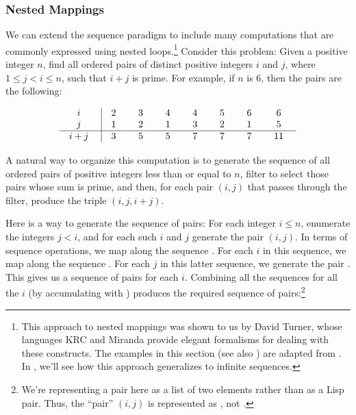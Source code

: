 \subsubsection*{Nested Mappings}

We can extend the sequence paradigm to include many computations that are
commonly expressed using nested loops.\footnote{This approach to nested
mappings was shown to us by David Turner, whose languages KRC and Miranda
provide elegant formalisms for dealing with these constructs.  The examples in
this section (see also ) are adapted from .  In
, we'll see how this approach generalizes to infinite
sequences.} Consider this problem: Given a positive integer \( n \), find all
ordered pairs of distinct positive integers \( i \) and \( j \), where
\( 1 \le j < i \le n \), such that \( i + j \) is prime.  For example, if \( n \) is 6,
then the pairs are the following:

$$\vbox{
\offinterlineskip
\halign{
\strut \hfil \quad #\quad \hfil & \vrule
	\hfil \quad #\quad \hfil &
	\hfil \quad #\quad \hfil &
	\hfil \quad #\quad \hfil &
	\hfil \quad #\quad \hfil &
	\hfil \quad #\quad \hfil &
	\hfil \quad #\quad \hfil &
	\hfil \quad #\quad \hfil \cr

$i$ 	& 2 & 3 & 4 & 4 & 5 & 6 & 6 \cr
$j$ 	& 1 & 2 & 1 & 3 & 2 & 1 & 5 \cr
\noalign{\hrule}
$i + j$	& 3 & 5 & 5 & 7 & 7 & 7 & 11 \cr}
}$$

A natural way to organize this computation is to generate the sequence of all
ordered pairs of positive integers less than or equal to \( n \), filter to
select those pairs whose sum is prime, and then, for each pair \( (i, j) \)
that passes through the filter, produce the triple \( (i, j, i + j) \).

Here is a way to generate the sequence of pairs: For each integer \( i \le n \),
enumerate the integers \( j < i \), and for each such \( i \) and \( j \)
generate the pair \( (i, j) \).  In terms of sequence operations, we map along
the sequence .  For each \( i \) in this sequence,
we map along the sequence .  For each
\( j \) in this latter sequence, we generate the pair .  This
gives us a sequence of pairs for each \( i \).  Combining all the sequences for
all the \( i \) (by accumulating with ) produces the required
sequence of pairs:\footnote{We're representing a pair here as a list of two
elements rather than as a Lisp pair.  Thus, the ``pair'' \( (i, j) \) is
represented as , not .}

